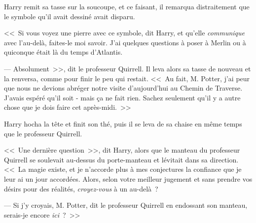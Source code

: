 Harry remit sa tasse sur la soucoupe, et ce faisant, il remarqua distraitement que le symbole qu'il avait dessiné avait disparu.

<<~Si vous voyez une pierre avec ce symbole, dit Harry, et qu'elle \emph{communique} avec l'au-delà, faites-le moi savoir. J'ai quelques questions à poser à Merlin ou à quiconque était là du temps d'Atlantis.

--- Absolument~>>, dit le professeur Quirrell. Il leva alors sa tasse de nouveau et la renversa, comme pour finir le peu qui restait. <<~Au fait, M. Potter, j'ai peur que nous ne devions abréger notre visite d'aujourd'hui au Chemin de Traverse. J'avais espéré qu'il soit - mais ça ne fait rien. Sachez seulement qu'il y a autre chose que je dois faire cet après-midi.~>>

Harry hocha la tête et finit son thé, puis il se leva de sa chaise en même temps que le professeur Quirrell.

<<~Une dernière question~>>, dit Harry, alors que le manteau du professeur Quirrell se soulevait au-dessus du porte-manteau et lévitait dans sa direction. <<~La magie existe, et je n'accorde plus à mes conjectures la confiance que je leur ai un jour accordées. Alors, selon votre meilleur jugement et sans prendre vos désirs pour des réalités, \emph{croyez-vous} à un au-delà~?

--- Si j'y croyais, M. Potter, dit le professeur Quirrell en endossant son manteau, serais-je encore \emph{ici}~?~>>

